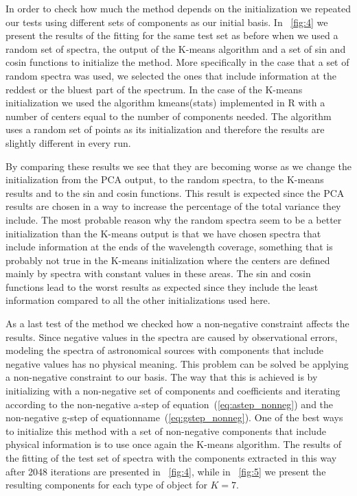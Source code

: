 \documentclass[12pt,preprint]{aastex}
\newcommand{\equationname}{equation}
\begin{document}
In order to check how much the method depends on the initialization we
repeated our tests using different sets of components as our initial
basis. In \figurename~\ref{fig:4} we present the results of the
fitting for the same test set as before when we used a random set of
spectra, the output of the K-means algorithm and a set of sin and
cosin functions to initialize the method. More specifically in the
case that a set of random spectra was used, we selected the ones that
include information at the reddest or the bluest part of the
spectrum. In the case of the K-means initialization we used the
algorithm kmeans(stats) implemented in R with a number of centers
equal to the number of components needed. The algorithm uses a random
set of points as its initialization and therefore the results are
slightly different in every run.

By comparing these results we see that they are becoming worse as we
change the initialization from the PCA output, to the random spectra,
to the K-means results and to the sin and cosin functions. This result
is expected since the PCA results are chosen in a way to increase the
percentage of the total variance they include. The most probable
reason why the random spectra seem to be a better initialization than
the K-means output is that we have chosen spectra that include
information at the ends of the wavelength coverage, something that is
probably not true in the K-means initialization where the centers are
defined mainly by spectra with constant values in these areas. The sin
and cosin functions lead to the worst results as expected since they
include the least information compared to all the other
initializations used here.

As a last test of the method we checked how a non-negative constraint
affects the results. Since negative values in the spectra are caused
by observational errors, modeling the spectra of astronomical sources
with components that include negative values has no physical
meaning. This problem can be solved be applying a non-negative
constraint to our basis. The way that this is achieved is by
initializing with a non-negative set of components and coefficients
and iterating according to the non-negative a-step of
\equationname~(\ref{eq:astep_nonneg}) and the non-negative g-step of
equationname~(\ref{eq:gstep_nonneg}). One of the best ways to
initialize this method with a set of non-negative components that
include physical information is to use once again the K-means
algorithm. The results of the fitting of the test set of spectra with
the components extracted in this way after 2048 iterations are
presented in \figurename~\ref{fig:4}, while in \figurename~\ref{fig:5}
we present the resulting components for each type of object for $K=7$.
\end{document}

